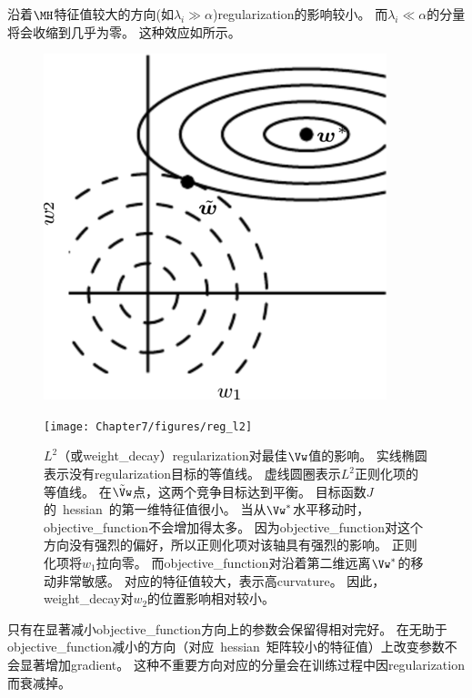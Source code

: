 沿着$\MH$特征值较大的方向(如$\lambda_i \gg \alpha$)\gls{regularization}的影响较小。
而$\lambda_i \ll \alpha$的分量将会收缩到几乎为零。
这种效应如所示。
\begin{figure}[!htb]
\ifOpenSource
\centerline{\includegraphics[scale=0.5]{images/54.png}}
\else
\centerline{\texttt{[image: Chapter7/figures/reg\_l2]}}
\fi
\caption{$L^2$（或\gls{weight_decay}）\gls{regularization}对最佳$\Vw$值的影响。
实线椭圆表示没有\gls{regularization}目标的等值线。
虚线圆圈表示$L^2$正则化项的等值线。
在$\tilde{\Vw}$点，这两个竞争目标达到平衡。
目标函数$J$的~\gls{hessian}~的第一维特征值很小。
当从$\Vw^*$水平移动时，\gls{objective_function}不会增加得太多。
因为\gls{objective_function}对这个方向没有强烈的偏好，所以正则化项对该轴具有强烈的影响。
正则化项将$w_1$拉向零。
而\gls{objective_function}对沿着第二维远离$\Vw^*$的移动非常敏感。
对应的特征值较大，表示高\gls{curvature}。
因此，\gls{weight_decay}对$w_2$的位置影响相对较小。
}
\label{fig:chap7_reg_l2}
\end{figure}


只有在显著减小\gls{objective_function}方向上的参数会保留得相对完好。
在无助于\gls{objective_function}减小的方向（对应~\gls{hessian}~矩阵较小的特征值）上改变参数不会显著增加\gls{gradient}。
这种不重要方向对应的分量会在训练过程中因\gls{regularization}而衰减掉。


